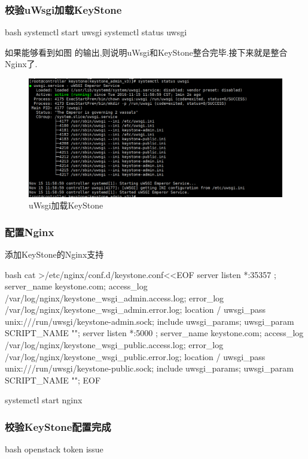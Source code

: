 \subsubsection{校验uWsgi加载KeyStone}
\begin{code-block}{bash}
systemctl start uwsgi
systemctl status uwsgi
\end{code-block}

如果能够看到如图 的输出,则说明uWsgi和KeyStone整合完毕.接下来就是整合Nginx了.
\begin{figure}[H]
  \centering
  \includegraphics[scale=0.38]{uwsgi.png}
  \caption{uWsgi加载KeyStone}
  \label{fig:uwsgi}
\end{figure}

\subsubsection{配置Nginx}
添加KeyStone的Nginx支持
\begin{code-block}{bash}
cat >/etc/nginx/conf.d/keystone.conf<<EOF
server {
  listen                *:35357 ;
  server_name           keystone.com;
  access_log            /var/log/nginx/keystone_wsgi_admin.access.log;
  error_log             /var/log/nginx/keystone_wsgi_admin.error.log;
  location / {
    uwsgi_pass       unix:///run/uwsgi/keystone-admin.sock;
    include          uwsgi_params;
    uwsgi_param      SCRIPT_NAME   "";
  }
}
server {
  listen                *:5000 ;
  server_name           keystone.com;
  access_log            /var/log/nginx/keystone_wsgi_public.access.log;
  error_log             /var/log/nginx/keystone_wsgi_public.error.log;
  location / {
    uwsgi_pass       unix:///run/uwsgi/keystone-public.sock;
    include          uwsgi_params;
    uwsgi_param      SCRIPT_NAME   "";
  }
}
EOF

systemctl start nginx
\end{code-block}

\subsubsection{校验KeyStone配置完成}
\begin{code-block}{bash}
openstack token issue
\end{code-block}
